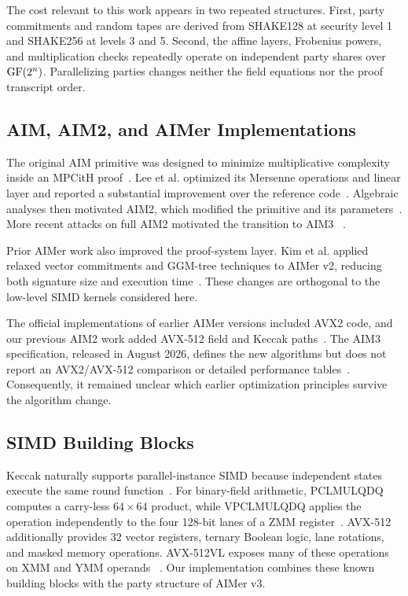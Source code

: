 The cost relevant to this work appears in two repeated structures.  First,
party commitments and random tapes are derived from SHAKE128 at security level
1 and SHAKE256 at levels 3 and 5.  Second, the affine layers, Frobenius powers,
and multiplication checks repeatedly operate on independent party shares over
$\operatorname{GF}\!\left(2^{n}\right)$.  Parallelizing parties changes neither the field equations nor the
proof transcript order.

\subsection{AIM, AIM2, and AIMer Implementations}

The original AIM primitive was designed to minimize multiplicative complexity
inside an MPCitH proof~\cite{kim2023aim}.  Lee et al. optimized its Mersenne
operations and linear layer and reported a substantial improvement over the
reference code~\cite{lee2023high}.  Algebraic analyses then motivated AIM2,
which modified the primitive and its parameters~\cite{kim2023aim2}.  More
recent attacks on full AIM2 motivated the transition to AIM3
~\cite{biryukov2026magic,sun2025high}.

Prior AIMer work also improved the proof-system layer.  Kim et al. applied
relaxed vector commitments and GGM-tree techniques to AIMer v2, reducing both
signature size and execution time~\cite{kim2025relaxed}.  These changes are
orthogonal to the low-level SIMD kernels considered here.

The official implementations of earlier AIMer versions included AVX2 code,
and our previous AIM2 work added AVX-512 field and Keccak
paths~\cite{lee2026aimeravx512}.  The AIM3 specification, released in August
2026, defines the new algorithms but does not report an AVX2/AVX-512
comparison or detailed performance tables~\cite{cho2026aimer3}.  Consequently,
it remained unclear which earlier optimization principles survive the
algorithm change.

\subsection{SIMD Building Blocks}

Keccak naturally supports parallel-instance SIMD because independent states
execute the same round function~\cite{bertoni2013keccak}.  For binary-field
arithmetic, PCLMULQDQ computes a carry-less $64\times64$ product, while
VPCLMULQDQ applies the operation independently to the four 128-bit lanes of a
ZMM register~\cite{drucker2018fast}.  AVX-512 additionally provides 32 vector
registers, ternary Boolean logic, lane rotations, and masked memory operations.
AVX-512VL exposes many of these operations on XMM and YMM operands
~\cite{anderson2018enhanced}.  Our implementation combines these known
building blocks with the party structure of AIMer v3.
